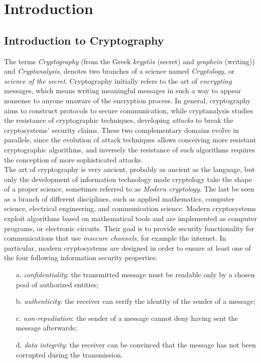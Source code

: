 
\chapter{Introduction} %

\label{ChapterIntroduction}


\section{Introduction to Cryptography}
The terms \emph{Cryptography} (from the Greek \emph{krypt\`os} (secret) and \emph{graphein} (writing)) and \emph{Cryptanalysis}, denotes two branches of a science named \emph{Cryptology}, or \emph{science of the secret}. Cryptography initially refers to the art of \emph{encrypting} messages, which means writing meaningful messages in such a way to appear nonsense to anyone unaware of the encryption process. In general, cryptography aims to construct protocols to secure communication, while cryptanalysis studies the resistance of cryptographic techniques, developing \emph{attacks} to break the cryptosystems' security claims. These two complementary domains evolve in parallels, since the evolution of attack techniques allows conceiving more resistant cryptographic algorithms, and inversely the resistance of such algorithms requires the conception of more sophisticated attacks.\\

The art of cryptography is very ancient, probably as ancient as the language, but only the development of information technology made cryptology take the shape of a proper science, sometimes referred to as \emph{Modern cryptology}. The last be seen as a branch of different disciplines, such as applied mathematics, computer science, electrical engineering, and communication science. Modern cryptosystems exploit algorithms based on mathematical tools and are implemented as computer programs, or electronic circuits. Their goal is to provide security functionality for communications that use \emph{insecure channels}, for example the internet. In particular, modern cryptosystems are designed in order to ensure at least one of the four following information security properties:
\begin{itemize}
\item[a.] \emph{confidentiality}: the transmitted message must be readable only by a chosen pool of authorized entities;
\item[b.] \emph{authenticity}: the receiver can verify the identity of the sender of a message;
\item[c.] \emph{non-repudiation}: the sender of a message cannot deny having sent the message afterwards;
\item[d.] \emph{data integrity}: the receiver can be convinced that the message has not been corrupted during the transmission.


\end{itemize} 

